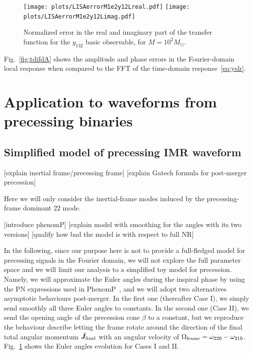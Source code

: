 \documentclass[aps,showpacs,%
prd,superscriptaddress,nofootinbib]{revtex4}
\newcommand{\Msol}{M_{\odot}}
\begin{document}
\begin{figure}
  \centering
  \texttt{[image: plots/LISAerrorM1e2y12Lreal.pdf]}
  \hspace{0.2cm}
  \texttt{[image: plots/LISAerrorM1e2y12Limag.pdf]}
  \caption{Normalized error in the real and imaginary part of the transfer function for the $y_{132}$ basic observable, for $M=10^{2} \Msol$.}
  \label{fig:prectoymodel}
\end{figure}

Fig.~\ref{fig:tdifdA} shows the amplitude and phase errors in the Fourier-domain local response when compared to the FFT of the time-domain response~\eqref{eq:yslr}.


\section{Application to waveforms from precessing binaries}
\label{sec:precession}


\subsection{Simplified model of precessing IMR waveform}
\label{subsec:precmodel}

[explain inertial frame/precessing frame]
[explain Gatech formula for post-merger precession]

Here we will only consider the inertial-frame modes induced by the precessing-frame dominant 22 mode.

[introduce phenomP]
[explain model with smoothing for the angles with its two versions]
[qualify how bad the model is with respect to full NR]

In the following, since our purpose here is not to provide a full-fledged model for precessing signals in the Fourier domain, we will not explore the full parameter space and we will limit our analysis to a simplified toy model for precession. Namely, we will approximate the Euler angles during the inspiral phase by using the PN expressions used in PhenomP~\cite{Hannam+13}, and we will adopt two alternatives asymptotic behaviours post-merger. In the first one (thereafter Case I), we simply send smoothly all three Euler angles to constants. In the second one (Case II), we send the opening angle of the precession cone $\beta$ to a constant, but we reproduce the behaviour describe letting the frame rotate around the direction of the final total angular momentum $\hat{\bm{J}}_{\rm final}$ with an angular velocity of $\Omega_{\rm frame} = \omega_{220} - \omega_{210}$. Fig.~\ref{fig:prectoymodel} shows the Euler angles evolution for Cases I and II.
\end{document}
